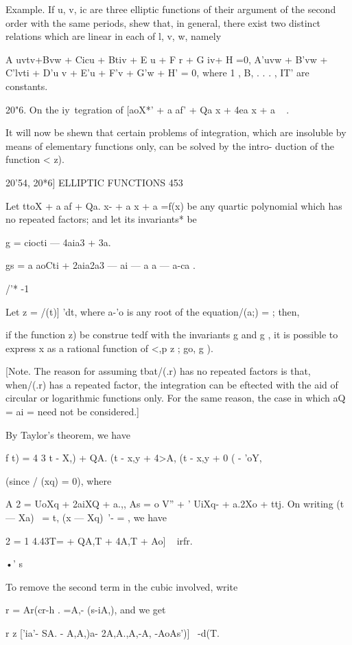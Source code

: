 {Example. If u, v, ic are three elliptic functions of their argument of
the second order with the same periods, shew that, in general, there
exist two distinct relations which are linear in each of l, v, w,
namely

A uvtv+Bvw + Cicu + Btiv + E u + F r + G iv+ H =0, A'uvw + B'vw +
C'lvti + D'u v + E'u + F'v + G'w + H' = 0, where 1 , B, . . . , IT'
are constants.

20"6. On the iy\ tegration of [aoX*' + a af' + Qa x + 4ea x + a ~ .

It will now be shewn that certain problems of integration, which are
insoluble by means of elementary functions only, can be solved by the
intro- duction of the function < z).

20'54, 20*6] ELLIPTIC FUNCTIONS 453

Let ttoX + a af + Qa. x- + a x + a =f(x) be any quartic polynomial
which has no repeated factors; and let its invariants* be

g = ciocti — 4aia3 + 3a.

gs = a aoCti + 2aia2a3 — ai — a a — a-ca .

/'* -1

Let z = /(t)] 'dt, where a-'o is any root of the equation/(a;) = ;
then,

if the function z) be construe tedf with the invariants g and g , it
is possible to express x as a rational function of <,p z ; go, g ).

[Note. The reason for assuming tbat/(.r) has no repeated factors is
that, when/(.r) has a repeated factor, the integration can be eftected
with the aid of circular or logarithmic functions only. For the same
reason, the case in which aQ = ai = need not be considered.]

By Taylor's theorem, we have

f t) = 4 3 t - X,) + QA. (t - x,y + 4>A, (t - x,y + 0 ( - 'oY,

(since / (xq) = 0), where

A 2 = UoXq + 2aiXQ + a.,, As = o V'' + ' UiXq- + a.2Xo + ttj. On
writing (t — Xa)~ = t, (x — Xq)~'- = , we have

2 = 1 4.43T= + QA,T + 4A,T + Ao] ~ irfr.

•' s

To remove the second term in the cubic involved, write

r = Ar(cr-h . =A,- (s-iA,), and we get

r z ['ia'- SA. - A,A,)a- 2A,A.,A,-A, -AoAs')]~ -d(T.

}
